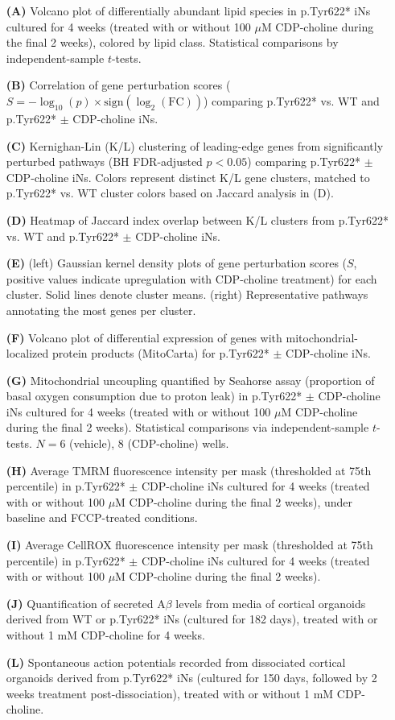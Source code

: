 \begin{itemize}
    \item[\textbf{(A)}] Volcano plot of differentially abundant lipid species in p.Tyr622* iNs cultured for 4 weeks (treated with or without 100 $\mu$M CDP-choline during the final 2 weeks), colored by lipid class.  Statistical comparisons by independent-sample $t$-tests.
    \item[\textbf{(B)}] Correlation of gene perturbation scores ($S = -\log_{10}(p)\times\text{sign}(\log_2(\text{FC}))$) comparing p.Tyr622* vs. WT and p.Tyr622* $\pm$ CDP-choline iNs.
    \item[\textbf{(C)}] Kernighan-Lin (K/L) clustering of leading-edge genes from significantly perturbed pathways (BH FDR-adjusted $p<0.05$) comparing p.Tyr622* $\pm$ CDP-choline iNs. Colors represent distinct K/L gene clusters, matched to p.Tyr622* vs. WT cluster colors based on Jaccard analysis in (D).
    \item[\textbf{(D)}] Heatmap of Jaccard index overlap between K/L clusters from p.Tyr622* vs. WT and p.Tyr622* $\pm$ CDP-choline iNs.
    \item[\textbf{(E)}] (left) Gaussian kernel density plots of gene perturbation scores ($S$, positive values indicate upregulation with CDP-choline treatment) for each cluster. Solid lines denote cluster means. (right) Representative pathways annotating the most genes per cluster.
    \item[\textbf{(F)}] Volcano plot of differential expression of genes with mitochondrial-localized protein products (MitoCarta) for p.Tyr622* $\pm$ CDP-choline iNs.
    \item[\textbf{(G)}] Mitochondrial uncoupling quantified by Seahorse assay (proportion of basal oxygen consumption due to proton leak) in p.Tyr622* $\pm$ CDP-choline iNs cultured for 4 weeks (treated with or without 100 $\mu$M CDP-choline during the final 2 weeks). Statistical comparisons via independent-sample $t$-tests. $N=6$ (vehicle), $8$ (CDP-choline) wells.
    \item[\textbf{(H)}] Average TMRM fluorescence intensity per mask (thresholded at 75th percentile) in p.Tyr622* $\pm$ CDP-choline iNs cultured for 4 weeks (treated with or without 100 $\mu$M CDP-choline during the final 2 weeks), under baseline and FCCP-treated conditions.
    \item[\textbf{(I)}] Average CellROX fluorescence intensity per mask (thresholded at 75th percentile) in p.Tyr622* $\pm$ CDP-choline iNs cultured for 4 weeks (treated with or without 100 $\mu$M CDP-choline during the final 2 weeks).
    \item[\textbf{(J)}] Quantification of secreted A$\beta$ levels from media of cortical organoids derived from WT or p.Tyr622* iNs (cultured for 182 days), treated with or without 1 mM CDP-choline for 4 weeks.
    \item[\textbf{(L)}] Spontaneous action potentials recorded from dissociated cortical organoids derived from p.Tyr622* iNs (cultured for 150 days, followed by 2 weeks treatment post-dissociation), treated with or without 1 mM CDP-choline.
\end{itemize}